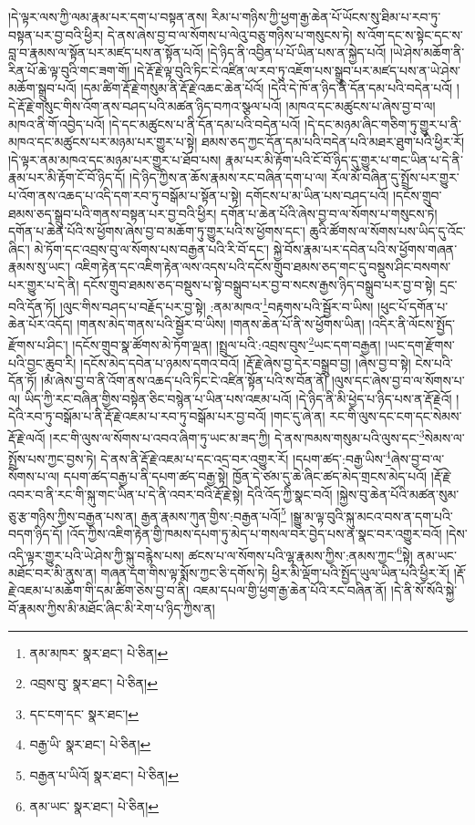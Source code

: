 །དེ་ལྟར་ལས་ཀྱི་ལམ་རྣམ་པར་དག་པ་བསྟན་ནས། རིམ་པ་གཉིས་ཀྱི་ཕྱག་རྒྱ་ཆེན་པོ་ཡོངས་སུ་ཐིམ་པ་རབ་ཏུ་བསྟན་པར་བྱ་བའི་ཕྱིར། དེ་ནས་ཞེས་བྱ་བ་ལ་སོགས་པ་ལེའུ་བཅུ་གཉིས་པ་གསུངས་ཏེ། ས་འོག་དང་ས་སྟེང་དང་ས་བླ་བ་རྣམས་ལ་སྟོན་པར་མཛད་པས་ན་སྟོན་པའོ། །དེ་ཉིད་ནི་འབྱིན་པ་པོ་ཡིན་པས་ན་སྐྱེད་པའོ། །ཡེ་ཤེས་མཆོག་ནི་རིན་པོ་ཆེ་ལྟ་བུའི་གང་ཟག་གོ། །དེ་རྡོ་རྗེ་ལྟ་བུའི་ཏིང་ངེ་འཛིན་ལ་རབ་ཏུ་འཇོག་པས་སྒྲུབ་པར་མཛད་པས་ན་ཡེ་ཤེས་མཆོག་སྒྲུབ་པའོ། །དམ་ཚིག་རྡོ་རྗེ་གསུམ་ནི་རྡོ་རྗེ་འཆང་ཆེན་པོའོ། །དེའི་དེ་ཁོ་ན་ཉིད་ནི་དོན་དམ་པའི་བདེན་པའོ། །དེ་རྡོ་རྗེ་གསུང་གིས་འོག་ནས་བཤད་པའི་མཚན་ཉིད་བཀའ་སྩལ་པའོ། །མཁའ་དང་མཚུངས་པ་ཞེས་བྱ་བ་ལ། མཁའ་ནི་གོ་འབྱེད་པའོ། །དེ་དང་མཚུངས་པ་ནི་དོན་དམ་པའི་བདེན་པའོ། །དེ་དང་མཉམ་ཞིང་གཅིག་ཏུ་གྱུར་པ་ནི་མཁའ་དང་མཚུངས་པར་མཉམ་པར་གྱུར་པ་སྟེ། ཐམས་ཅད་ཀྱང་དོན་དམ་པའི་བདེན་པའི་མཐར་ཐུག་པའི་ཕྱིར་རོ། །དེ་ལྟར་ནམ་མཁའ་དང་མཉམ་པར་གྱུར་པ་ཐོབ་པས། རྣམ་པར་མི་རྟོག་པའི་ངོ་བོ་ཉིད་དུ་གྱུར་པ་གང་ཡིན་པ་དེ་ནི་རྣམ་པར་མི་རྟོག་ངོ་བོ་ཉིད་དོ། །དེ་ཉིད་ཀྱིས་ན་ཆོས་རྣམས་རང་བཞིན་དག་པ་ལ། རོལ་མོ་བཞིན་དུ་སྤྲོས་པར་གྱུར་པ་འོག་ནས་འཆད་པ་འདི་དག་རབ་ཏུ་བསྒོམ་པ་སྟོན་པ་སྟེ། དགོངས་པ་མ་ཡིན་པས་བཤད་པའོ། །དངོས་གྲུབ་ཐམས་ཅད་སྒྲུབ་པའི་གནས་བསྟན་པར་བྱ་བའི་ཕྱིར། དགོན་པ་ཆེན་པོའི་ཞེས་བྱ་བ་ལ་སོགས་པ་གསུངས་ཏེ། དགོན་པ་ཆེན་པོའི་ས་ཕྱོགས་ཞེས་བྱ་བ་མཆོག་ཏུ་གྱུར་པའི་ས་ཕྱོགས་དང་། ཆུའི་ཚོགས་ལ་སོགས་པས་ཡིད་དུ་འོང་ཞིང་། མེ་ཏོག་དང་འབྲས་བུ་ལ་སོགས་པས་བརྒྱན་པའི་རི་བོ་དང་། སྐྱེ་བོས་རྣམ་པར་དབེན་པའི་ས་ཕྱོགས་གཞན་རྣམས་སུ་ཡང་། འཇིག་རྟེན་དང་འཇིག་རྟེན་ལས་འདས་པའི་དངོས་གྲུབ་ཐམས་ཅད་གང་དུ་བསྡུས་ཤིང་བསགས་པར་གྱུར་པ་དེ་ནི། དངོས་གྲུབ་ཐམས་ཅད་བསྡུས་པ་སྟེ་བསྒྲུབ་པར་བྱ་བ་སངས་རྒྱས་ཉིད་བསྒྲུབ་པར་བྱ་བ་སྟེ། དྲང་བའི་དོན་ཏོ། །ལུང་གིས་བཤད་པ་བརྗོད་པར་བྱ་སྟེ། :ནམ་མཁའ་\footnote{ནམ་མཁར་  སྣར་ཐང་།  པེ་ཅིན། }བརྟགས་པའི་སྦྱོར་བ་ཡིས། །ཕུང་པོ་དགོན་པ་ཆེན་པོར་འདོད། །གནས་མེད་གནས་པའི་སྦྱོར་བ་ཡིས། །གནས་ཆེན་པོ་ནི་ས་ཕྱོགས་ཡིན། །འདིར་ནི་ལོངས་སྤྱོད་རྫོགས་པ་ཤིང་། །དངོས་གྲུབ་སྣ་ཚོགས་མེ་ཏོག་ལྡན། །སྤྲུལ་པའི་:འབྲས་བུས་\footnote{འབྲས་བུ་  སྣར་ཐང་།  པེ་ཅིན། }ཡང་དག་བརྒྱན། །ཡང་དག་རྫོགས་པའི་བྱང་ཆུབ་རི། །དངོས་མེད་དབེན་པ་ཉམས་དགའ་བའོ། །རྡོ་རྗེ་ཞེས་བྱ་དེར་བསྒྲུབ་བྱ། །ཞེས་བྱ་བ་སྟེ། ངེས་པའི་དོན་ཏོ། །མཾ་ཞེས་བྱ་བ་ནི་འོག་ནས་འཆད་པའི་ཏིང་ངེ་འཛིན་སྟོན་པའི་ས་བོན་ནོ། །ལུས་དང་ཞེས་བྱ་བ་ལ་སོགས་པ་ལ། ཡིད་ཀྱི་རང་བཞིན་གྱིས་བསྟེན་ཅིང་བསྙེན་པ་ཡིན་པས་འཇམ་པའོ། །དེ་ཉིད་ནི་མི་ཕྱེད་པ་ཉིད་པས་ན་རྡོ་རྗེའོ། །དེའི་རབ་ཏུ་བསྒོམ་པ་ནི་རྡོ་རྗེ་འཇམ་པ་རབ་ཏུ་བསྒོམ་པར་བྱ་བའོ། །གང་དུ་ཞེ་ན། རང་གི་ལུས་དང་ངག་དང་སེམས་རྡོ་རྗེ་ལའོ། །རང་གི་ལུས་ལ་སོགས་པ་འབའ་ཞིག་ཏུ་ཡང་མ་ཟད་ཀྱི། དེ་ནས་ཁམས་གསུམ་པའི་ལུས་དང་\footnote{དང་ངག་དང་  སྣར་ཐང་། }སེམས་ལ་སྤྲོས་པས་ཀྱང་བྱས་ཏེ། དེ་ནས་ནི་རྡོ་རྗེ་འཇམ་པ་དང་འདྲ་བར་འགྱུར་རོ། །དཔག་ཚད་:བརྒྱ་ཡིས་\footnote{བརྒྱ་ཡི་  སྣར་ཐང་།  པེ་ཅིན། }ཞེས་བྱ་བ་ལ་སོགས་པ་ལ། དཔག་ཚད་བརྒྱ་པ་ནི་དཔག་ཚད་བརྒྱ་སྟེ། ཁྱོན་དེ་ཙམ་དུ་ཆེ་ཞིང་ཚད་མེད་གྲངས་མེད་པའོ། །རྡོ་རྗེ་འབར་བ་ནི་རང་གི་སྐུ་གང་ཡིན་པ་དེ་ནི་འབར་བའི་རྡོ་རྗེ་སྟེ། དེའི་འོད་ཀྱི་སྣང་བའོ། །སྐྱེས་བུ་ཆེན་པོའི་མཚན་སུམ་ཅུ་རྩ་གཉིས་ཀྱིས་བརྒྱན་པས་ན། རྒྱན་རྣམས་ཀུན་གྱིས་:བརྒྱན་པའོ།\footnote{བརྒྱན་པ་ཡིའོ།  སྣར་ཐང་།  པེ་ཅིན། } །སྒྱུ་མ་ལྟ་བུའི་སྐུ་མངའ་བས་ན་དག་པའི་བདག་ཉིད་དོ། །འོད་ཀྱིས་འཇིག་རྟེན་གྱི་ཁམས་དཔག་ཏུ་མེད་པ་གསལ་བར་བྱེད་པས་ན་སྣང་བར་འགྱུར་བའོ། །དེས་འདི་ལྟར་གྱུར་པའི་ཡེ་ཤེས་ཀྱི་སྐུ་བརྙེས་པས། ཚངས་པ་ལ་སོགས་པའི་ལྷ་རྣམས་ཀྱིས་:ནམས་ཀྱང་\footnote{ནམ་ཡང་  སྣར་ཐང་།  པེ་ཅིན། }སྟེ། ནམ་ཡང་མཐོང་བར་མི་ནུས་ན། གཞན་དག་གིས་ལྟ་སྨོས་ཀྱང་ཅི་དགོས་ཏེ། ཕྱིར་མི་ལྡོག་པའི་སྤྱོད་ཡུལ་ཡིན་པའི་ཕྱིར་རོ། །རྡོ་རྗེ་འཇམ་པ་མཆོག་གི་དམ་ཚིག་ཅེས་བྱ་བ་ནི། འཇམ་དཔལ་གྱི་ཕྱག་རྒྱ་ཆེན་པོའི་རང་བཞིན་ནོ། །དེ་ནི་སོ་སོའི་སྐྱེ་བོ་རྣམས་ཀྱིས་མི་མཐོང་ཞིང་མི་རེག་པ་ཉིད་ཀྱིས་ན། 